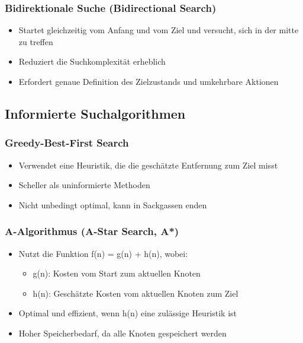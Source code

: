 \subsubsection*{Bidirektionale Suche (Bidirectional Search)}
\begin{itemize}
    \item Startet gleichzeitig vom Anfang und vom Ziel und versucht, sich in der mitte zu treffen
    \item {} Reduziert die Suchkomplexität erheblich
    \item {} Erfordert genaue Definition des Zielzustands und umkehrbare Aktionen
\end{itemize}
\subsection{Informierte Suchalgorithmen}
\subsubsection*{Greedy-Best-First Search}
\begin{itemize}
    \item Verwendet eine Heuristik, die die geschätzte Entfernung zum Ziel misst
    \item {} Scheller als uninformierte Methoden
    \item {} Nicht unbedingt optimal, kann in Sackgassen enden
\end{itemize}
\subsubsection*{A-Algorithmus (A-Star Search, A*)}
\begin{itemize}
    \item Nutzt die Funktion f(n) = g(n) + h(n), wobei:
    \begin{itemize}
        \item g(n): Kosten vom Start zum aktuellen Knoten
        \item h(n): Geschätzte Kosten vom aktuellen Knoten zum Ziel
    \end{itemize}
    \item {} Optimal und effizient, wenn h(n) eine zulässige Heuristik ist
    \item {} Hoher Speicherbedarf, da alle Knoten gespeichert werden
\end{itemize}
